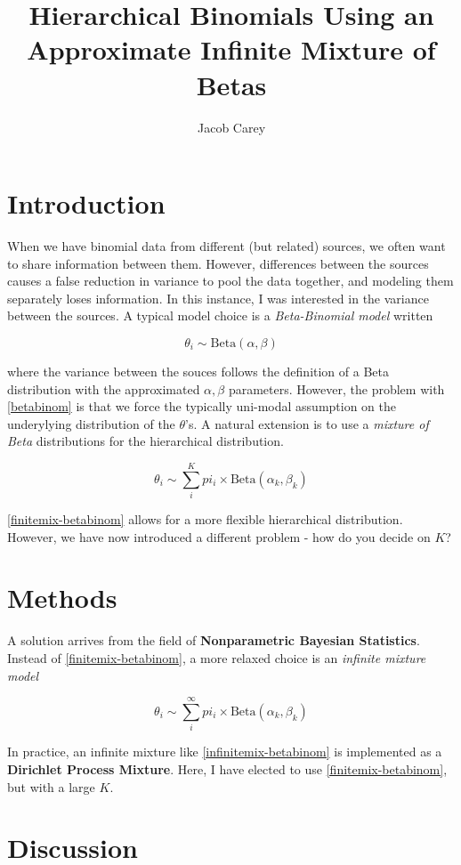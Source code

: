 \documentclass{article}
\begin{document}
\title{Hierarchical Binomials Using an Approximate Infinite Mixture of Betas}
\author{Jacob Carey}

\maketitle

\section{Introduction}

When we have binomial data from different (but related) sources, we often want to share information between them. However, differences between the sources causes a false reduction in variance to pool the data together, and modeling them separately loses information. In this instance, I was interested in the variance between the sources. A typical model choice is a \textit{Beta-Binomial model} written

\begin{equation}\label{betabinom}
\theta_i \sim \text{Beta}(\alpha, \beta)
\end{equation}

where the variance between the souces follows the definition of a Beta distribution with the approximated $\alpha, \beta$ parameters. However, the problem with \eqref{betabinom} is that we force the typically uni-modal assumption on the underylying distribution of the $\theta$'s. A natural extension is to use a \textit{mixture of Beta} distributions for the hierarchical distribution.

\begin{equation}\label{finitemix-betabinom}
\theta_i \sim \sum_i^K pi_i \times \text{Beta}(\alpha_k, \beta_k)
\end{equation}

\eqref{finitemix-betabinom} allows for a more flexible hierarchical distribution. However, we have now introduced a different problem - how do you decide on $K$?

\section{Methods}

A solution arrives from the field of \textbf{Nonparametric Bayesian Statistics}. Instead of \eqref{finitemix-betabinom}, a more relaxed choice is an \textit{infinite mixture model}

\begin{equation}\label{infinitemix-betabinom}
\theta_i \sim \sum_i^{\infty} pi_i \times \text{Beta}(\alpha_k, \beta_k)
\end{equation}

In practice, an infinite mixture like \eqref{infinitemix-betabinom} is implemented as a \textbf{Dirichlet Process Mixture}. Here, I have elected to use \eqref{finitemix-betabinom}, but with a large $K$.

\section{Discussion}
\end{document}
